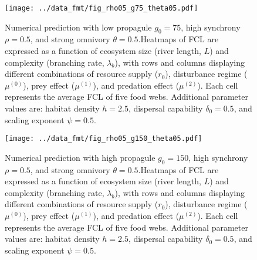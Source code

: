 \newpage

\begin{figure}
\centering
\texttt{[image: ../data\_fmt/fig\_rho05\_g75\_theta05.pdf]}
\caption{\label{fig:fig-num7}Numerical prediction with low propagule
\(g_0 = 75\), high synchrony \(\rho = 0.5\), and strong omnivory
\(\theta = 0.5\).Heatmaps of FCL are expressed as a function of
ecosystem size (river length, \(L\)) and complexity (branching rate,
\(\lambda_b\)), with rows and columns displaying different combinations
of resource supply (\(r_0\)), disturbance regime (\(\mu^{(0)}\)), prey
effect (\(\mu^{(1)}\)), and predation effect (\(\mu^{(2)}\)). Each cell
represents the average FCL of five food webs. Additional parameter
values are: habitat density \(h=2.5\), dispersal capability
\(\delta_0=0.5\), and scaling exponent \(\psi=0.5\).}
\end{figure}

\newpage

\begin{figure}
\centering
\texttt{[image: ../data\_fmt/fig\_rho05\_g150\_theta05.pdf]}
\caption{\label{fig:fig-num8}Numerical prediction with high propagule
\(g_0 = 150\), high synchrony \(\rho = 0.5\), and strong omnivory
\(\theta = 0.5\).Heatmaps of FCL are expressed as a function of
ecosystem size (river length, \(L\)) and complexity (branching rate,
\(\lambda_b\)), with rows and columns displaying different combinations
of resource supply (\(r_0\)), disturbance regime (\(\mu^{(0)}\)), prey
effect (\(\mu^{(1)}\)), and predation effect (\(\mu^{(2)}\)). Each cell
represents the average FCL of five food webs. Additional parameter
values are: habitat density \(h=2.5\), dispersal capability
\(\delta_0=0.5\), and scaling exponent \(\psi=0.5\).}
\end{figure}

\newpage
